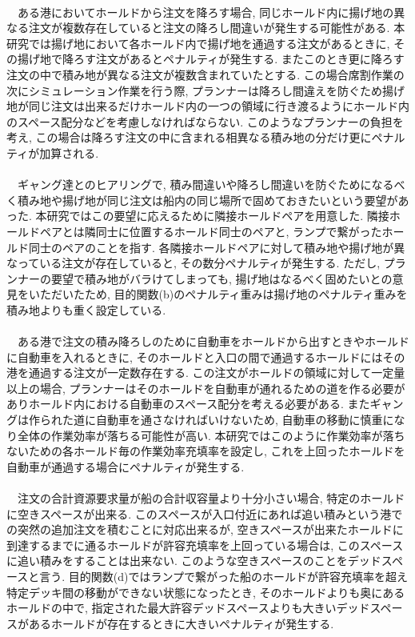 \documentclass[a4j,11pt,twocolumn]{jsarticle}
\begin{document}
 \\
　ある港においてホールドから注文を降ろす場合, 同じホールド内に揚げ地の異なる注文が複数存在していると注文の降ろし間違いが発生する可能性がある. 本研究では揚げ地において各ホールド内で揚げ地を通過する注文があるときに, その揚げ地で降ろす注文があるとペナルティが発生する.  またこのとき更に降ろす注文の中で積み地が異なる注文が複数含まれていたとする. この場合席割作業の次にシミュレーション作業を行う際, プランナーは降ろし間違えを防ぐため揚げ地が同じ注文は出来るだけホールド内の一つの領域に行き渡るようにホールド内のスペース配分などを考慮しなければならない. このようなプランナーの負担を考え, この場合は降ろす注文の中に含まれる相異なる積み地の分だけ更にペナルティが加算される. \\


 \\
　ギャング達とのヒアリングで, 積み間違いや降ろし間違いを防ぐためになるべく積み地や揚げ地が同じ注文は船内の同じ場所で固めておきたいという要望があった. 本研究ではこの要望に応えるために隣接ホールドペアを用意した. 隣接ホールドペアとは隣同士に位置するホールド同士のペアと, ランプで繋がったホールド同士のペアのことを指す. 各隣接ホールドペアに対して積み地や揚げ地が異なっている注文が存在していると, その数分ペナルティが発生する. ただし, プランナーの要望で積み地がバラけてしまっても, 揚げ地はなるべく固めたいとの意見をいただいたため, 目的関数(b)のペナルティ重みは揚げ地のペナルティ重みを積み地よりも重く設定している. \\

 \\
　ある港で注文の積み降ろしのために自動車をホールドから出すときやホールドに自動車を入れるときに, そのホールドと入口の間で通過するホールドにはその港を通過する注文が一定数存在する. この注文がホールドの領域に対して一定量以上の場合, プランナーはそのホールドを自動車が通れるための道を作る必要がありホールド内における自動車のスペース配分を考える必要がある. またギャングは作られた道に自動車を通さなければいけないため, 自動車の移動に慎重になり全体の作業効率が落ちる可能性が高い. 本研究ではこのように作業効率が落ちないための各ホールド毎の作業効率充填率を設定し, これを上回ったホールドを自動車が通過する場合にペナルティが発生する. \\

 \\
　注文の合計資源要求量が船の合計収容量より十分小さい場合, 特定のホールドに空きスペースが出来る. このスペースが入口付近にあれば追い積みという港での突然の追加注文を積むことに対応出来るが, 空きスペースが出来たホールドに到達するまでに通るホールドが許容充填率を上回っている場合は, このスペースに追い積みをすることは出来ない. このような空きスペースのことをデッドスペースと言う. 目的関数(d)ではランプで繋がった船のホールドが許容充填率を超え特定デッキ間の移動ができない状態になったとき, そのホールドよりも奥にあるホールドの中で, 指定された最大許容デッドスペースよりも大きいデッドスペースがあるホールドが存在するときに大きいペナルティが発生する. \\
\end{document}
